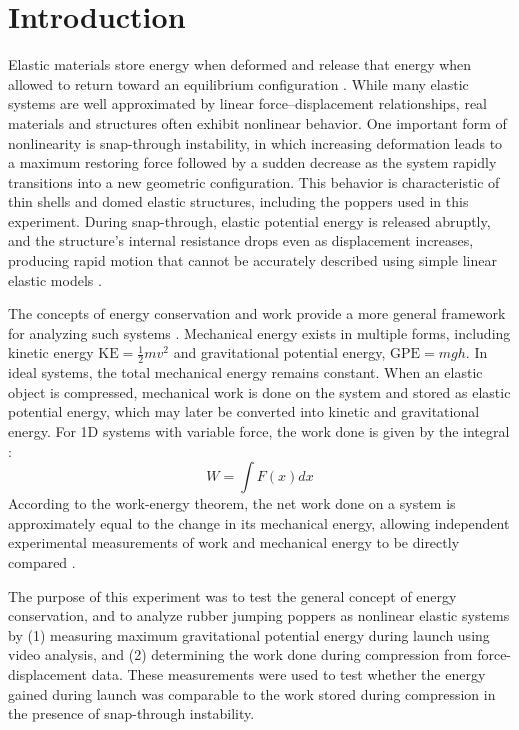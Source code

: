 \documentclass[reprint,amsmath,amssymb,aps,twoside]{revtex4-2} %
\begin{document}

\section{Introduction}
Elastic materials store energy when deformed and release that energy when allowed to return toward an equilibrium configuration \cite{tipler,barrons,openstax,simeonov:2016:coefficient,sendrowicz2022stored}. While many elastic systems are well approximated by linear force--displacement relationships, real materials and structures often exhibit nonlinear behavior. One important form of nonlinearity is snap-through instability, in which increasing deformation leads to a maximum restoring force followed by a sudden decrease as the system rapidly transitions into a new geometric configuration. This behavior is characteristic of thin shells and domed elastic structures, including the poppers used in this experiment. During snap-through, elastic potential energy is released abruptly, and the structure’s internal resistance drops even as displacement increases, producing rapid motion that cannot be accurately described using simple linear elastic models \cite{gomez:2017:critical,gent:1999:surface}. 

The concepts of energy conservation and work provide a more general framework for analyzing such systems \cite{tipler,barrons,openstax}. Mechanical energy exists in multiple forms, including kinetic energy $\text{KE} = \frac{1}{2}mv^2$ and gravitational potential energy, $\text{GPE} = mgh$. In ideal systems, the total mechanical energy remains constant. When an elastic object is compressed, mechanical work is done on the system and stored as elastic potential energy, which may later be converted into kinetic and gravitational energy. For 1D systems with variable force, the work done is given by the integral \cite{tipler,barrons,openstax}:
\begin{equation}
W = \int F(x)dx
\end{equation}
According to the work-energy theorem, the net work done on a system is approximately equal to the change in its mechanical energy, allowing independent experimental measurements of work and mechanical energy to be directly compared \cite{halliday:2014:fundamentals,tipler,barrons,openstax}.

The purpose of this experiment was to test the general concept of energy conservation, and to analyze rubber jumping poppers as nonlinear elastic systems by (1) measuring maximum gravitational potential energy during launch using video analysis, and (2) determining the work done during compression from force-displacement data. These measurements were used to test whether the energy gained during launch was comparable to the work stored during compression in the presence of snap-through instability. 
\end{document}
